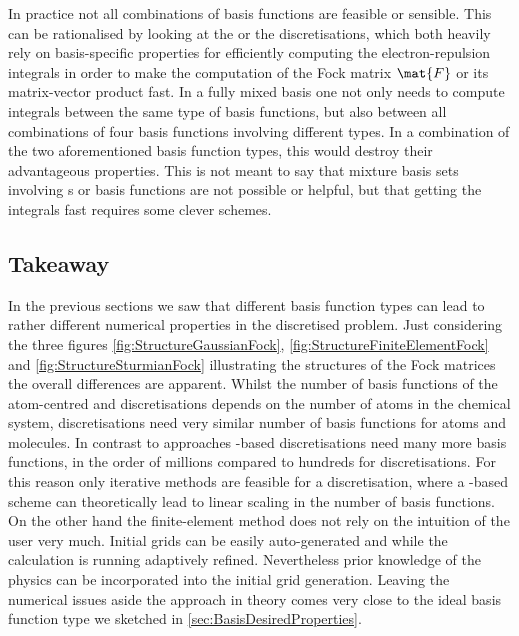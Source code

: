 In practice not all combinations of basis functions are feasible or sensible.
This can be rationalised by looking at the {\cGTO} or the \CS discretisations,
which both heavily rely on basis-specific properties for efficiently
computing the electron-repulsion integrals
in order to make the computation of the Fock matrix $\mat{F}$
or its matrix-vector product fast.
In a fully mixed basis one not only needs to compute \ERI integrals
between the same type of basis functions,
but also between all combinations of four basis functions involving different types.
In a combination of the two aforementioned basis function types,
this would destroy their advantageous properties.
This is not meant to say that mixture basis sets involving
{\cGTO}s or {\CS} basis functions are not possible or helpful,
but that getting the integrals fast requires some clever schemes.

\subsection{Takeaway}
In the previous sections we saw that different basis function types
can lead to rather different numerical properties in the discretised \HF problem.
Just considering the three figures
\vref{fig:StructureGaussianFock},
\vref{fig:StructureFiniteElementFock}
and \vref{fig:StructureSturmianFock}
illustrating the structures of the Fock matrices
the overall differences are apparent.
Whilst the number of basis functions of the atom-centred
\cGTO and \CS discretisations depends on the number of atoms
in the chemical system,
\FE discretisations need very similar number of basis functions
for atoms and molecules.
In contrast to \ACO approaches \FE-based discretisations
need many more basis functions, in the order of millions
compared to hundreds for \ACO discretisations.
For this reason only iterative methods
are feasible for a \FE discretisation,
where a \contraction-based scheme can theoretically
lead to linear scaling in the number of basis functions.
On the other hand the finite-element method
does not rely on the intuition of the user very much.
Initial grids can be easily auto-generated and
while the calculation is running adaptively refined.
Nevertheless prior knowledge of the physics can be incorporated
into the initial grid generation.
Leaving the numerical issues aside
the \FE approach in theory comes very close to the ideal
basis function type we sketched in \vref{sec:BasisDesiredProperties}.

